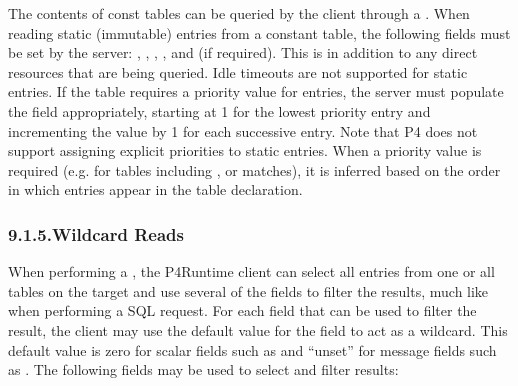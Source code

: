 \documentclass[11pt]{article}
\begin{document}
{%
The contents of const tables can be queried by the client through a
. When reading static (immutable) entries from a constant table,
the following fields must be set by the server: , , ,
, and  (if required). This is in addition to any
direct resources that are being queried.  Idle timeouts are not supported for
static entries. If the table requires a priority value for entries, the server
must populate the  field appropriately, starting at 1 for the lowest
priority entry and incrementing the value by 1 for each successive entry. Note
that P4 does not support assigning explicit priorities to static
entries. When a priority value is required (e.g. for tables including ,
 or  matches), it is inferred based on the order in which
entries appear in the table declaration.%

\subsubsection{9.1.5.\hspace*{0.5em}Wildcard Reads}\label{sec-table-wildcard-reads}%

\noindent{}When performing a , the P4Runtime client can select all entries
from one or all tables on the target and use several of the  fields
to filter the results, much like when performing a SQL request. For each field
that can be used to filter the result, the client may use the default value for
the field to act as a wildcard. This default value is zero for scalar fields
such as  and \textquotedblleft{}unset\textquotedblright{} for message fields such as . The following
fields may be used to select and filter results:%

}
\end{document}
